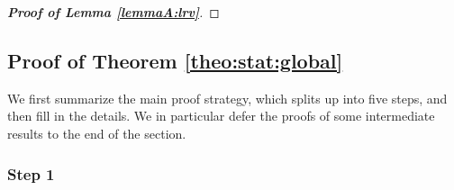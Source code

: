 \documentclass[12pt]{article}
\makeatletter
\renewcommand{\eqref}[1]{\tagform@{\ref{#1}}}
\makeatother
\begin{document}
\begin{proof}[\textnormal{\textbf{Proof of Lemma \ref{lemmaA:lrv}}}]
\end{proof}



\subsection*{Proof of Theorem \ref{theo:stat:global}}\label{subsec-appendix-stat-equality}


We first summarize the main proof strategy, which splits up into five steps, and then fill in the details. We in particular defer the proofs of some intermediate results to the end of the section. 


\subsubsection*{Step 1}
\end{document}
